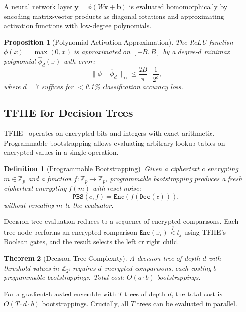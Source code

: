 \documentclass[11pt]{article}
\newtheorem{theorem}{Theorem}
\newtheorem{proposition}[theorem]{Proposition}
\newtheorem{definition}{Definition}
\begin{document}
A neural network layer $\mathbf{y} = \phi(W\mathbf{x} + \mathbf{b})$ is
evaluated homomorphically by encoding matrix-vector products as diagonal
rotations and approximating activation functions with low-degree polynomials.

\begin{proposition}[Polynomial Activation Approximation]
The ReLU function $\phi(x) = \max(0, x)$ is approximated on $[-B, B]$ by a
degree-$d$ minimax polynomial $\hat{\phi}_d(x)$ with error:
\begin{equation}
\|\phi - \hat{\phi}_d\|_\infty \leq \frac{2B}{\pi} \cdot
\frac{1}{2^d},
\end{equation}
where $d = 7$ suffices for $<$0.1\% classification accuracy loss.
\end{proposition}

\subsection{TFHE for Decision Trees}

TFHE~\cite{tfhe2020} operates on encrypted bits and integers with exact
arithmetic. Programmable bootstrapping allows evaluating arbitrary lookup tables
on encrypted values in a single operation.

\begin{definition}[Programmable Bootstrapping]
Given a ciphertext $c$ encrypting $m \in \mathbb{Z}_p$ and a function $f:
\mathbb{Z}_p \to \mathbb{Z}_p$, programmable bootstrapping produces a fresh
ciphertext encrypting $f(m)$ with reset noise:
\begin{equation}
\texttt{PBS}(c, f) = \texttt{Enc}(f(\texttt{Dec}(c))),
\end{equation}
without revealing $m$ to the evaluator.
\end{definition}

Decision tree evaluation reduces to a sequence of encrypted comparisons. Each
tree node performs an encrypted comparison $\texttt{Enc}(x_i) \stackrel{?}{<}
t_j$ using TFHE's Boolean gates, and the result selects the left or right child.

\begin{theorem}[Decision Tree Complexity]
A decision tree of depth $d$ with threshold values in $\mathbb{Z}_{2^b}$
requires $d$ encrypted comparisons, each costing $b$ programmable bootstrappings.
Total cost: $O(d \cdot b)$ bootstrappings.
\end{theorem}

For a gradient-boosted ensemble with $T$ trees of depth $d$, the total cost is
$O(T \cdot d \cdot b)$ bootstrappings. Crucially, all $T$ trees can be
evaluated in parallel.
\end{document}
